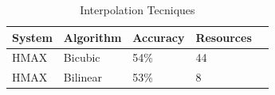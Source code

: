 \begin{table}[h]
\renewcommand{\arraystretch}{1.3}
\caption {Interpolation Tecniques}
\label{table:compute}
\begin{tabular}{lllll}
 System & Algorithm & Accuracy & Resources\\\hline
 HMAX	& Bicubic   & 54\% & 44\\\hline
 HMAX   & Bilinear  & 53\% & 8\\\hline
\end{tabular}
\end{table}
